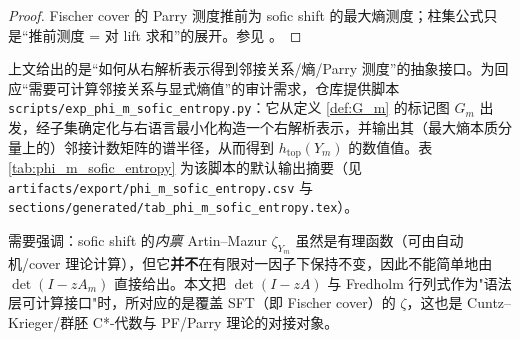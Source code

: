\begin{proof}
Fischer cover 的 Parry 测度推前为 sofic shift 的最大熵测度；柱集公式只是“推前测度 = 对 lift 求和”的展开。参见 \cite{LindMarcus1995,Kitchens1998SymbolicDynamics}。
\end{proof}

\begin{remark}[可复现的邻接关系与熵计算（脚本）]\label{rem:phi_m_entropy_script}
上文给出的是“如何从右解析表示得到邻接关系/熵/Parry 测度”的抽象接口。为回应“需要可计算邻接关系与显式熵值”的审计需求，仓库提供脚本 \texttt{scripts/exp\_phi\_m\_sofic\_entropy.py}：它从定义 \ref{def:G_m} 的标记图 $G_m$ 出发，经子集确定化与右语言最小化构造一个右解析表示，并输出其（最大熵本质分量上的）邻接计数矩阵的谱半径，从而得到 $h_{\mathrm{top}}(Y_m)$ 的数值值。表 \ref{tab:phi_m_sofic_entropy} 为该脚本的默认输出摘要（见 \texttt{artifacts/export/phi\_m\_sofic\_entropy.csv} 与 \texttt{sections/generated/tab\_phi\_m\_sofic\_entropy.tex}）。
\end{remark}



\begin{remark}\label{rem:sofic-zeta-vs-cover}
需要强调：sofic shift 的\emph{内禀} Artin--Mazur \(\zeta_{Y_m}\) 虽然是有理函数（可由自动机/cover 理论计算），但它\textbf{并不}在有限对一因子下保持不变，因此不能简单地由 \(\det(I-zA_m)\) 直接给出。本文把 \(\det(I-zA)\) 与 Fredholm 行列式作为"语法层可计算接口"时，所对应的是覆盖 SFT（即 Fischer cover）的 \(\zeta\)，这也是 Cuntz--Krieger/群胚 C*-代数与 PF/Parry 理论的对接对象。
\end{remark}
